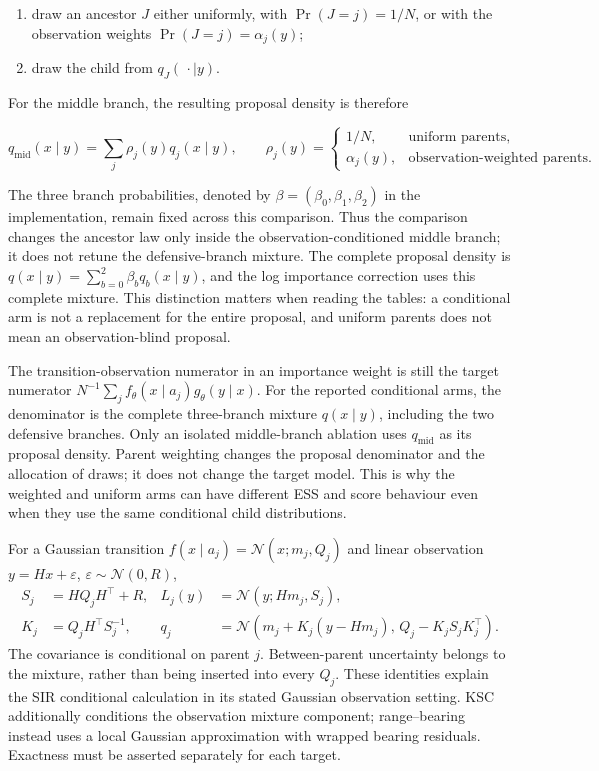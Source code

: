 \begin{enumerate}
  \item draw an ancestor $J$ either uniformly, with
        $\Pr(J=j)=1/N$, or with the observation weights
        $\Pr(J=j)=\alpha_j(y)$;
  \item draw the child from $q_J(\,\cdot\mid y)$.
\end{enumerate}

For the middle branch, the resulting proposal density is therefore

\begin{equation}
 q_{\mathrm{mid}}(x\mid y)=\sum_j\rho_j(y)q_j(x\mid y),
 \qquad
 \rho_j(y)=\begin{cases}
  1/N,&\text{uniform parents},\\
  \alpha_j(y),&\text{observation-weighted parents}.
 \end{cases}
 \label{eq:parent-proposal-policy-mixture}
\end{equation}

The three branch probabilities, denoted by $\beta=(\beta_0,\beta_1,\beta_2)$
in the implementation, remain fixed across this comparison. Thus the
comparison changes the ancestor law only inside the observation-conditioned
middle branch; it does not retune the defensive-branch mixture. The complete
proposal density is
$q(x\mid y)=\sum_{b=0}^2\beta_b q_b(x\mid y)$, and the log importance
correction uses this complete mixture. This distinction matters when reading
the tables: a conditional arm is not a replacement for the entire proposal,
and uniform parents does not mean an observation-blind proposal.

The transition-observation numerator in an importance weight is still the
target numerator $N^{-1}\sum_j f_\theta(x\mid a_j)g_\theta(y\mid x)$.
For the reported conditional arms, the denominator is the complete
three-branch mixture $q(x\mid y)$, including the two defensive branches.
Only an isolated middle-branch ablation uses $q_{\mathrm{mid}}$ as its
proposal density. Parent weighting changes the proposal denominator and the
allocation of draws; it does not change the target model. This is why the
weighted and uniform arms can have different ESS and score behaviour even
when they use the same conditional child distributions.

For a Gaussian transition $f(x\mid a_j)=\mathcal N(x;m_j,Q_j)$ and linear
observation $y=Hx+\varepsilon$, $\varepsilon\sim\mathcal N(0,R)$,
\begin{align}
 S_j&=HQ_jH^\top+R,&L_j(y)&=\mathcal N(y;Hm_j,S_j),\\
 K_j&=Q_jH^\top S_j^{-1},&
 q_j&=\mathcal N\!\left(m_j+K_j(y-Hm_j),\,Q_j-K_jS_jK_j^\top\right).
\end{align}
The covariance is conditional on parent $j$. Between-parent uncertainty
belongs to the mixture, rather than being inserted into every $Q_j$.
These identities explain the SIR conditional calculation in its stated
Gaussian observation setting. KSC additionally conditions the observation
mixture component; range--bearing instead uses a local Gaussian approximation
with wrapped bearing residuals. Exactness must be asserted separately for
each target.


